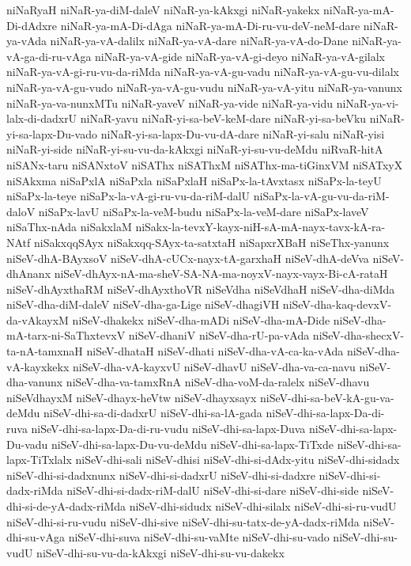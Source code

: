 {niNaRyaH
niNaR-ya-diM-daleV
niNaR-ya-kAkxgi
niNaR-yakekx
niNaR-ya-mA-Di-dAdxre
niNaR-ya-mA-Di-dAga
niNaR-ya-mA-Di-ru-vu-deV-neM-dare
niNaR-ya-vAda
niNaR-ya-vA-dalilx
niNaR-ya-vA-dare
niNaR-ya-vA-do-Dane
niNaR-ya-vA-ga-di-ru-vAga
niNaR-ya-vA-gide
niNaR-ya-vA-gi-deyo
niNaR-ya-vA-gilalx
niNaR-ya-vA-gi-ru-vu-da-riMda
niNaR-ya-vA-gu-vadu
niNaR-ya-vA-gu-vu-dilalx
niNaR-ya-vA-gu-vudo
niNaR-ya-vA-gu-vudu
niNaR-ya-vA-yitu
niNaR-ya-vanunx
niNaR-ya-va-nunxMTu
niNaR-yaveV
niNaR-ya-vide
niNaR-ya-vidu
niNaR-ya-vi-lalx-di-dadxrU
niNaR-yavu
niNaR-yi-sa-beV-keM-dare
niNaR-yi-sa-beVku
niNaR-yi-sa-lapx-Du-vado
niNaR-yi-sa-lapx-Du-vu-dA-dare
niNaR-yi-salu
niNaR-yisi
niNaR-yi-side
niNaR-yi-su-vu-da-kAkxgi
niNaR-yi-su-vu-deMdu
niRvaR-hitA
niSANx-taru
niSANxtoV
niSAThx
niSAThxM
niSAThx-ma-tiGinxVM
niSATxyX
niSAkxma
niSaPxlA
niSaPxla
niSaPxlaH
niSaPx-la-tAvxtasx
niSaPx-la-teyU
niSaPx-la-teye
niSaPx-la-vA-gi-ru-vu-da-riM-dalU
niSaPx-la-vA-gu-vu-da-riM-daloV
niSaPx-lavU
niSaPx-la-veM-budu
niSaPx-la-veM-dare
niSaPx-laveV
niSaThx-nAda
niSakxlaM
niSakx-la-tevxY-kayx-niH-sA-mA-nayx-tavx-kA-ra-NAtf
niSakxqqSAyx
niSakxqq-SAyx-ta-satxtaH
niSapxrXBaH
niSeThx-yanunx
niSeV-dhA-BAyxsoV
niSeV-dhA-cUCx-nayx-tA-garxhaH
niSeV-dhA-deVva
niSeV-dhAnanx
niSeV-dhAyx-nA-ma-sheV-SA-NA-ma-noyxV-nayx-vayx-Bi-cA-rataH
niSeV-dhAyxthaRM
niSeV-dhAyxthoVR
niSeVdha
niSeVdhaH
niSeV-dha-diMda
niSeV-dha-diM-daleV
niSeV-dha-ga-Lige
niSeV-dhagiVH
niSeV-dha-kaq-devxV-da-vAkayxM
niSeV-dhakekx
niSeV-dha-mADi
niSeV-dha-mA-Dide
niSeV-dha-mA-tarx-ni-SaThxtevxV
niSeV-dhaniV
niSeV-dha-rU-pa-vAda
niSeV-dha-shecxV-ta-nA-tamxnaH
niSeV-dhataH
niSeV-dhati
niSeV-dha-vA-ca-ka-vAda
niSeV-dha-vA-kayxkekx
niSeV-dha-vA-kayxvU
niSeV-dhavU
niSeV-dha-va-ca-navu
niSeV-dha-vanunx
niSeV-dha-va-tamxRnA
niSeV-dha-voM-da-ralelx
niSeV-dhavu
niSeVdhayxM
niSeV-dhayx-heVtw
niSeV-dhayxsayx
niSeV-dhi-sa-beV-kA-gu-va-deMdu
niSeV-dhi-sa-di-dadxrU
niSeV-dhi-sa-lA-gada
niSeV-dhi-sa-lapx-Da-di-ruva
niSeV-dhi-sa-lapx-Da-di-ru-vudu
niSeV-dhi-sa-lapx-Duva
niSeV-dhi-sa-lapx-Du-vadu
niSeV-dhi-sa-lapx-Du-vu-deMdu
niSeV-dhi-sa-lapx-TiTxde
niSeV-dhi-sa-lapx-TiTxlalx
niSeV-dhi-sali
niSeV-dhisi
niSeV-dhi-si-dAdx-yitu
niSeV-dhi-sidadx
niSeV-dhi-si-dadxnunx
niSeV-dhi-si-dadxrU
niSeV-dhi-si-dadxre
niSeV-dhi-si-dadx-riMda
niSeV-dhi-si-dadx-riM-dalU
niSeV-dhi-si-dare
niSeV-dhi-side
niSeV-dhi-si-de-yA-dadx-riMda
niSeV-dhi-sidudx
niSeV-dhi-silalx
niSeV-dhi-si-ru-vudU
niSeV-dhi-si-ru-vudu
niSeV-dhi-sive
niSeV-dhi-su-tatx-de-yA-dadx-riMda
niSeV-dhi-su-vAga
niSeV-dhi-suva
niSeV-dhi-su-vaMte
niSeV-dhi-su-vado
niSeV-dhi-su-vudU
niSeV-dhi-su-vu-da-kAkxgi
niSeV-dhi-su-vu-dakekx
}
